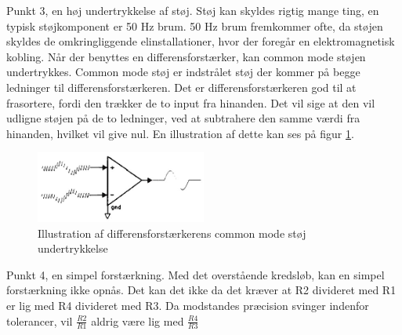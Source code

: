 Punkt 3, en høj undertrykkelse af støj. Støj kan skyldes rigtig mange ting, en typisk støjkomponent er 50 Hz brum. 50 Hz brum fremkommer ofte, da støjen skyldes de omkringliggende elinstallationer, hvor der foregår en elektromagnetisk kobling. Når der benyttes en differensforstærker, kan common mode støjen undertrykkes. Common mode støj er indstrålet støj der kommer på begge ledninger til differensforstærkeren. Det er differensforstærkeren god til at frasortere, fordi den trækker de to input fra hinanden. Det vil sige at den vil udligne støjen på de to ledninger, ved at subtrahere den samme værdi fra hinanden, hvilket vil give nul. En illustration af dette kan ses på figur \ref{fig:differensNoise}\citep{ASBbog}. 
\begin{figure}[H]
	\centering
	\includegraphics[width=0.5\textwidth]{billeder/Hardware/differensnoise.jpg}
	\caption{Illustration af differensforstærkerens common mode støj undertrykkelse}
	\label{fig:differensNoise}
\end{figure}

Punkt 4, en simpel forstærkning. Med det overstående kredsløb, kan en simpel forstærkning ikke opnås. Det kan det ikke da det kræver at R2 divideret med R1 er lig med R4 divideret med R3. Da modstandes præcision svinger indenfor tolerancer, vil $\frac{R2}{R1}$ aldrig være lig med $\frac{R4}{R3}$

